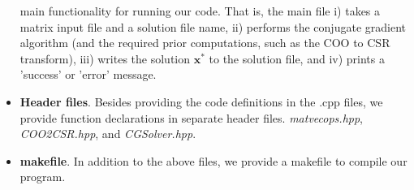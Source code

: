 \documentclass[12pt, a4paper]{article}
\begin{document}
\begin{itemize}
    main functionality for running our code. That is, the main file i) takes 
    a matrix input file and a solution file name, ii) performs the conjugate 
    gradient algorithm (and the required prior computations, such as the COO 
    to CSR transform), iii) writes the solution $\mathbf{x}^*$ to 
    the solution file, and iv) prints a 'success' or 'error' message.
    \item \textbf{Header files}. Besides providing the code definitions in 
    the .cpp files, we provide function declarations in separate header files. 
    \textit{matvecops.hpp}, \textit{COO2CSR.hpp}, and \textit{CGSolver.hpp}.
    \item \textbf{makefile}. In addition to the above files, we provide a 
    makefile to compile our program.
\end{itemize}
\end{document}
